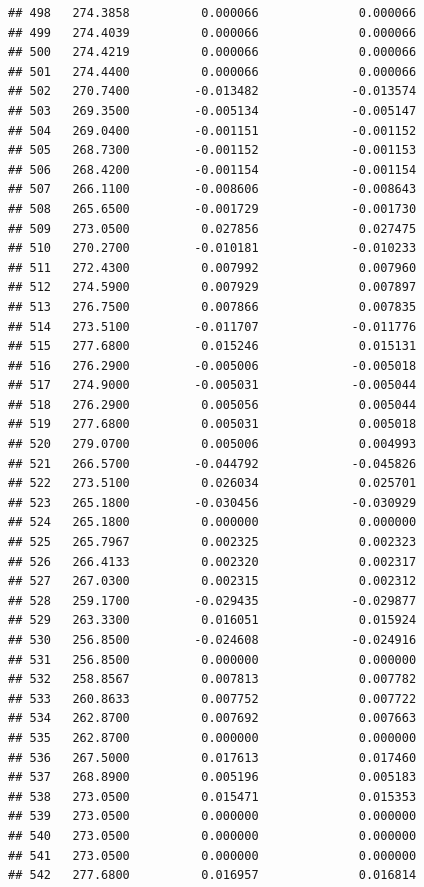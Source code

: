 \documentclass[
]{article}
\begin{document}
\begin{verbatim}
## 498   274.3858          0.000066              0.000066
## 499   274.4039          0.000066              0.000066
## 500   274.4219          0.000066              0.000066
## 501   274.4400          0.000066              0.000066
## 502   270.7400         -0.013482             -0.013574
## 503   269.3500         -0.005134             -0.005147
## 504   269.0400         -0.001151             -0.001152
## 505   268.7300         -0.001152             -0.001153
## 506   268.4200         -0.001154             -0.001154
## 507   266.1100         -0.008606             -0.008643
## 508   265.6500         -0.001729             -0.001730
## 509   273.0500          0.027856              0.027475
## 510   270.2700         -0.010181             -0.010233
## 511   272.4300          0.007992              0.007960
## 512   274.5900          0.007929              0.007897
## 513   276.7500          0.007866              0.007835
## 514   273.5100         -0.011707             -0.011776
## 515   277.6800          0.015246              0.015131
## 516   276.2900         -0.005006             -0.005018
## 517   274.9000         -0.005031             -0.005044
## 518   276.2900          0.005056              0.005044
## 519   277.6800          0.005031              0.005018
## 520   279.0700          0.005006              0.004993
## 521   266.5700         -0.044792             -0.045826
## 522   273.5100          0.026034              0.025701
## 523   265.1800         -0.030456             -0.030929
## 524   265.1800          0.000000              0.000000
## 525   265.7967          0.002325              0.002323
## 526   266.4133          0.002320              0.002317
## 527   267.0300          0.002315              0.002312
## 528   259.1700         -0.029435             -0.029877
## 529   263.3300          0.016051              0.015924
## 530   256.8500         -0.024608             -0.024916
## 531   256.8500          0.000000              0.000000
## 532   258.8567          0.007813              0.007782
## 533   260.8633          0.007752              0.007722
## 534   262.8700          0.007692              0.007663
## 535   262.8700          0.000000              0.000000
## 536   267.5000          0.017613              0.017460
## 537   268.8900          0.005196              0.005183
## 538   273.0500          0.015471              0.015353
## 539   273.0500          0.000000              0.000000
## 540   273.0500          0.000000              0.000000
## 541   273.0500          0.000000              0.000000
## 542   277.6800          0.016957              0.016814

\end{verbatim}
\end{document}

